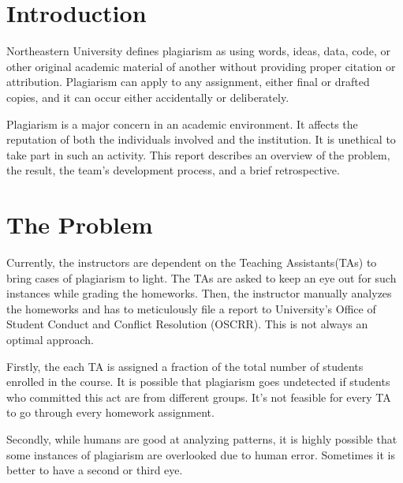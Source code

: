 \documentclass[12pt]{article}
\begin{document}

\tableofcontents
\pagebreak


\section{Introduction}
\par Northeastern University defines plagiarism as using words, ideas, data, code, or other original academic material of another without providing proper citation or attribution. Plagiarism can apply to any assignment, either final or drafted copies, and it can occur either accidentally or deliberately. 

\par Plagiarism is a major concern in an academic environment. It affects the reputation of both the individuals involved and the institution. It is unethical to take part in such an activity. This report describes an overview of the problem, the result, the team's development process, and a brief retrospective. 

\section{The Problem}
\par Currently, the instructors are dependent on the Teaching Assistants(TAs) to bring cases of plagiarism to light. The TAs are asked to keep an eye out for such instances while grading the homeworks. Then, the instructor manually analyzes the homeworks and has to meticulously file a report to University's Office of Student Conduct and Conflict Resolution (OSCRR). This is not always an optimal approach. 

\par Firstly, the each TA is assigned a fraction of the total number of students enrolled in the course. It is possible that plagiarism goes undetected if students who committed this act are from different groups. It's not feasible for every TA to go through every homework assignment. 

\par Secondly, while humans are good at analyzing patterns, it is highly possible that some instances of plagiarism are overlooked due to human error. Sometimes it is better to have a second or third eye. 
\end{document}

